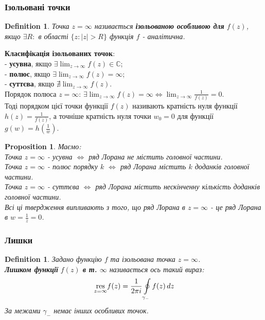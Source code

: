 \documentclass[a4paper, 10pt]{article}
\def\residue#1#2{\underset{z = {#1}}{\textrm{res}} {#2}}
\theoremstyle{theoremdd}
\theoremstyle{theoremdd}
\newtheorem{definition}[theorem]{Definition}
\theoremstyle{theoremdd}
\theoremstyle{theoremdd}
\theoremstyle{theoremdd}
\newtheorem{proposition}[theorem]{Proposition}
\theoremstyle{theoremdd}
\theoremstyle{theoremdd}
\theoremstyle{theoremdd}
\begin{document}
\subsubsection{Ізольовані точки}
\begin{definition}
Точка $z=\infty$ називається \textbf{ізольованою особливою для} $f(z)$, якщо $\exists R:$ в області $\{z: |z|>R\}$ функція $f$ - аналітична.
\end{definition}

\textbf{Класифікація ізольованих точок}:\\
	 - \textbf{усувна}, якщо $\displaystyle\exists \lim_{z \to \infty} f(z) \in \mathbb{C}$;\\
	 - \textbf{полюс}, якщо $\displaystyle\exists \lim_{z \to \infty} f(z) = \infty$;\\
	 - \textbf{суттєва}, якщо $\displaystyle \nexists \lim_{z \to \infty} f(z)$.
	 \bigskip \\
Порядок полюса $z = \infty$:
$\displaystyle \exists \lim_{z \to \infty} f(z) = \infty \iff \lim_{z \to \infty} \frac{1}{f(z)} = 0$.\\
Тоді порядком цієї точки функції $f(z)$ називають кратність нуля функції $\displaystyle h(z) = \frac{1}{f(z)}$, а точніше кратність нуля точки $w_0 = 0$ для функції $\displaystyle g(w) = h\left(\frac{1}{w}\right)$.

\begin{proposition} Маємо:\\
Точка $z = \infty$ - усувна $\iff$ ряд Лорана не містить головної частини.\\
Точка $z = \infty$ - полюс порядку $k$ $\iff$ ряд Лорана містить $k$ доданків головної частини.\\
Точка $z = \infty$ - суттєва $\iff$ ряд Лорана містить нескінченну кількість доданків головної частини.\\
\textit{Всі ці твердження випливають з того, що ряд Лорана в $z = \infty$ - це ряд Лорана в $\displaystyle w = \frac{1}{z} = 0$.}
\end{proposition}

\subsubsection{Лишки}
\begin{definition}
Задано функцію $f$ та ізольована точка $z = \infty$.\\
\textbf{Лишком функції} $f(z)$ \textbf{в т.} $\infty$ називається ось такий вираз:
\begin{align*}
\residue{\infty}{f(z)} = \frac{1}{2 \pi i} \oint\displaylimits_{\gamma_-} f(z)\,dz
\end{align*}
За межами $\gamma_-$ немає інших особливих точок.
\end{definition}
\end{document}
